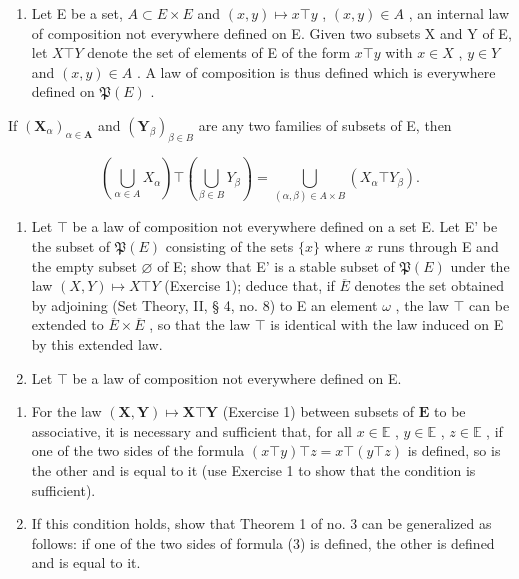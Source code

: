 \BourbakiExercisesSection

\begin{enumerate}
\def\labelenumi{\arabic{enumi}.}
\tightlist
\item
  Let E be a set, \(A \subset E \times E\) and \((x, y) \mapsto x \top y\) , \((x, y) \in A\) , an internal law of composition not everywhere defined on E. Given two subsets X and Y of E, let \(X \top Y\) denote the set of elements of E of the form \(x \top y\) with \(x \in X\) , \(y \in Y\) and \((x, y) \in A\) . A law of composition is thus defined which is everywhere defined on \(\mathfrak{P}(E)\) .
\end{enumerate}

If \((\mathbf{X}_{\alpha})_{\alpha \in \mathbf{A}}\) and \((\mathbf{Y}_{\beta})_{\beta \in B}\) are any two families of subsets of E, then

\[
\left(\bigcup_ {\alpha \in A} X _ {\alpha}\right) \top \left(\bigcup_ {\beta \in B} Y _ {\beta}\right) = \bigcup_ {(\alpha , \beta) \in A \times B} (X _ {\alpha} \top Y _ {\beta}).
\]

\begin{enumerate}
\def\labelenumi{\arabic{enumi}.}
\setcounter{enumi}{1}
\item
  Let \(\top\) be a law of composition not everywhere defined on a set E. Let E' be the subset of \(\mathfrak{P}(E)\) consisting of the sets \(\{x\}\) where \(x\) runs through E and the empty subset \(\varnothing\) of E; show that E' is a stable subset of \(\mathfrak{P}(E)\) under the law \((X,Y)\mapsto X\top Y\) (Exercise 1); deduce that, if \(\overline{E}\) denotes the set obtained by adjoining (Set Theory, II, § 4, no. 8) to E an element \(\omega\) , the law \(\top\) can be extended to \(\overline{E} \times \overline{E}\) , so that the law \(\top\) is identical with the law induced on E by this extended law.
\item
  Let \(\top\) be a law of composition not everywhere defined on E.
\end{enumerate}

\begin{enumerate}
\def\labelenumi{(\alph{enumi})}
\item
  For the law \((\mathbf{X}, \mathbf{Y}) \mapsto \mathbf{X} \top \mathbf{Y}\) (Exercise 1) between subsets of \(\mathbf{E}\) to be associative, it is necessary and sufficient that, for all \(x \in \mathbb{E}\) , \(y \in \mathbb{E}\) , \(z \in \mathbb{E}\) , if one of the two sides of the formula \((x \top y) \top z = x \top (y \top z)\) is defined, so is the other and is equal to it (use Exercise 1 to show that the condition is sufficient).
\item
  If this condition holds, show that Theorem 1 of no. 3 can be generalized as follows: if one of the two sides of formula (3) is defined, the other is defined and is equal to it.
\end{enumerate}

